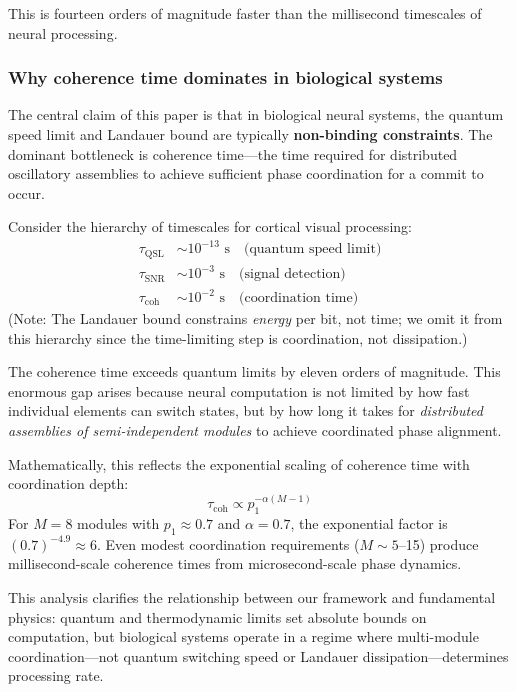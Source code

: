 \documentclass[12pt]{article}
\begin{document}
This is fourteen orders of magnitude faster than the millisecond timescales of neural processing.

\subsubsection{Why coherence time dominates in biological systems}

The central claim of this paper is that in biological neural systems, the quantum speed limit and Landauer bound are typically \textbf{non-binding constraints}. The dominant bottleneck is coherence time---the time required for distributed oscillatory assemblies to achieve sufficient phase coordination for a commit to occur.

Consider the hierarchy of timescales for cortical visual processing:
\begin{align}
\tau_{\mathrm{QSL}} &\sim 10^{-13} \text{ s} \quad \text{(quantum speed limit)} \\
\tau_{\mathrm{SNR}} &\sim 10^{-3} \text{ s} \quad \text{(signal detection)} \\
\tau_{\mathrm{coh}} &\sim 10^{-2} \text{ s} \quad \text{(coordination time)}
\end{align}
(Note: The Landauer bound constrains \emph{energy} per bit, not time; we omit it from this hierarchy since the time-limiting step is coordination, not dissipation.)

The coherence time exceeds quantum limits by eleven orders of magnitude. This enormous gap arises because neural computation is not limited by how fast individual elements can switch states, but by how long it takes for \emph{distributed assemblies of semi-independent modules} to achieve coordinated phase alignment.

Mathematically, this reflects the exponential scaling of coherence time with coordination depth:
\[
\tau_{\mathrm{coh}} \propto p_1^{-\alpha(M-1)}
\]
For $M = 8$ modules with $p_1 \approx 0.7$ and $\alpha = 0.7$, the exponential factor is $(0.7)^{-4.9} \approx 6$. Even modest coordination requirements ($M \sim 5$--15) produce millisecond-scale coherence times from microsecond-scale phase dynamics.

This analysis clarifies the relationship between our framework and fundamental physics: quantum and thermodynamic limits set absolute bounds on computation, but biological systems operate in a regime where multi-module coordination---not quantum switching speed or Landauer dissipation---determines processing rate.
\end{document}
